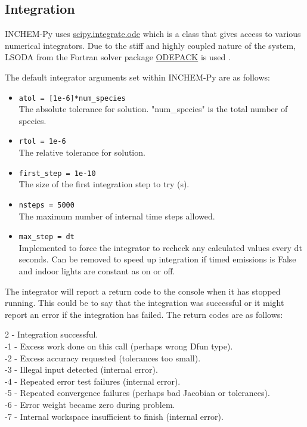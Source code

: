 \documentclass[a4paper]{refart}
\begin{document}
\subsection{Integration}\label{Integration}
INCHEM-Py uses \hyperlink{https://docs.scipy.org/doc/scipy/reference/generated/scipy.integrate.ode.html}{scipy.integrate.ode} which is a class that gives access to various numerical integrators. Due to the stiff and highly coupled nature of the system, LSODA from the Fortran solver package \hyperlink{http://www.netlib.org/odepack/}{ODEPACK} is used \cite{Hindmarsh1983}. 

The default integrator arguments set within INCHEM-Py are as follows:
\begin{itemize}
    \item \texttt{atol = [1e-6]*num\_species}\\
    The absolute tolerance for solution. "num\_species" is the total number of species.
    \item \texttt{rtol = 1e-6}\\
    The relative tolerance for solution.
    \item \texttt{first\_step = 1e-10}\\
    The size of the first integration step to try (s).
    \item \texttt{nsteps = 5000}\\
    The maximum number of internal time steps allowed.
    \item \texttt{max\_step = dt}\\
    Implemented to force the integrator to recheck any calculated values every dt seconds. Can be removed to speed up integration if timed emissions is False and indoor lights are constant as on or off.
\end{itemize}


The integrator will report a return code to the console when it has stopped running. This could be to say that the integration was successful or it might report an error if the integration has failed. The return codes are as follows:

2 - Integration successful.\\
-1 - Excess work done on this call (perhaps wrong Dfun type).\\
-2 - Excess accuracy requested (tolerances too small).\\
-3 - Illegal input detected (internal error).\\
-4 - Repeated error test failures (internal error).\\
-5 - Repeated convergence failures (perhaps bad Jacobian or tolerances).\\
-6 - Error weight became zero during problem.\\
-7 - Internal workspace insufficient to finish (internal error).
\end{document}
